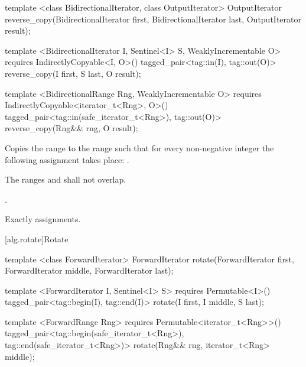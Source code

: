 %
\begin{removedblock}
\begin{itemdecl}
template <class BidirectionalIterator, class OutputIterator>
  OutputIterator
    reverse_copy(BidirectionalIterator first,
                 BidirectionalIterator last, OutputIterator result);
\end{itemdecl}
\end{removedblock}
\begin{addedblock}
\begin{itemdecl}
template <BidirectionalIterator I, Sentinel<I> S, WeaklyIncrementable O>
  requires IndirectlyCopyable<I, O>()
  tagged_pair<tag::in(I), tag::out(O)> reverse_copy(I first, S last, O result);

template <BidirectionalRange Rng, WeaklyIncrementable O>
  requires IndirectlyCopyable<iterator_t<Rng>, O>()
  tagged_pair<tag::in(safe_iterator_t<Rng>), tag::out(O)>
    reverse_copy(Rng&& rng, O result);
\end{itemdecl}
\end{addedblock}

\begin{itemdescr}
\pnum
\effects
Copies the range
to the range
such that
for every non-negative integer
the following assignment takes place:
.

\pnum
\requires
The ranges
and
shall not overlap.

\pnum
\returns
{}.

\pnum
\complexity
Exactly
assignments.
\end{itemdescr}

[alg.rotate]{Rotate}

%
\begin{removedblock}
\begin{itemdecl}
template <class ForwardIterator>
  ForwardIterator rotate(ForwardIterator first, ForwardIterator middle,
              ForwardIterator last);
\end{itemdecl}
\end{removedblock}
\begin{addedblock}
\begin{itemdecl}
template <ForwardIterator I, Sentinel<I> S>
  requires Permutable<I>()
  tagged_pair<tag::begin(I), tag::end(I)> rotate(I first, I middle, S last);

template <ForwardRange Rng>
  requires Permutable<iterator_t<Rng>>()
  tagged_pair<tag::begin(safe_iterator_t<Rng>), tag::end(safe_iterator_t<Rng>)>
    rotate(Rng&& rng, iterator_t<Rng> middle);
\end{itemdecl}
\end{addedblock}

